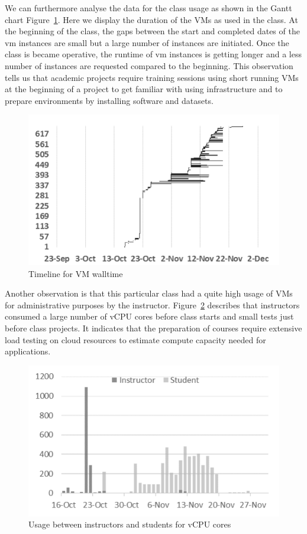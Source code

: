 \documentclass{sig-alternate-05-2015}
\begin{document}
We can furthermore analyse the data for the class usage as shown in
the Gantt chart Figure~\ref{F:fig4}. Here we display the duration of
the VMs as used in the class. At the beginning of the class, the gaps
between the start and completed dates of the vm instances are small
but a large number of instances are initiated. Once the class is
became operative, the runtime of vm instances is getting longer and a
less number of instances are requested compared to the beginning. This
observation tells us that academic projects require training sessions
using short running VMs at the beginning of a project to get familiar
with using infrastructure and to prepare environments by installing
software and datasets.

\begin{figure}[htb] 
  \centering 
    \includegraphics[width=1.0\columnwidth]{images/fig3.pdf} 
  \caption{Timeline for VM walltime}\label{F:fig4} 
\end{figure} 

Another observation is that this particular class had a quite high
usage of VMs for administrative purposes by the
instructor. Figure~\ref{F:fig5} describes that instructors consumed a
large number of vCPU cores before class starts and small tests just
before class projects. It indicates that the preparation of courses
require extensive load testing on cloud resources to estimate compute
capacity needed for applications.

\begin{figure}[htb] 
  \centering 
    \includegraphics[width=1.0\columnwidth]{images/fig4.pdf} 
  \caption{Usage between instructors and students for vCPU cores}\label{F:fig5} 
\end{figure} 
\end{document}
